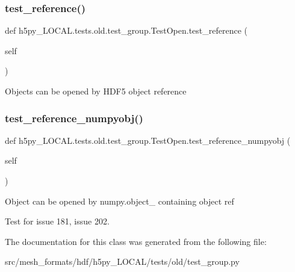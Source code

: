 \subsubsection{\texorpdfstring{test\+\_\+reference()}{test\_reference()}}
{\footnotesize\ttfamily def h5py\+\_\+\+L\+O\+C\+A\+L.\+tests.\+old.\+test\+\_\+group.\+Test\+Open.\+test\+\_\+reference (\begin{DoxyParamCaption}\item[{}]{self }\end{DoxyParamCaption})}

\begin{DoxyVerb}Objects can be opened by HDF5 object reference \end{DoxyVerb}
 \mbox{\label{classh5py__LOCAL_1_1tests_1_1old_1_1test__group_1_1TestOpen_a9458f640cd8ae18bd56071d00f30a915}} 
\subsubsection{\texorpdfstring{test\+\_\+reference\+\_\+numpyobj()}{test\_reference\_numpyobj()}}
{\footnotesize\ttfamily def h5py\+\_\+\+L\+O\+C\+A\+L.\+tests.\+old.\+test\+\_\+group.\+Test\+Open.\+test\+\_\+reference\+\_\+numpyobj (\begin{DoxyParamCaption}\item[{}]{self }\end{DoxyParamCaption})}

\begin{DoxyVerb}Object can be opened by numpy.object_ containing object ref

Test for issue 181, issue 202.
\end{DoxyVerb}
 

The documentation for this class was generated from the following file\+:\begin{DoxyCompactItemize}
\item 
src/mesh\+\_\+formats/hdf/h5py\+\_\+\+L\+O\+C\+A\+L/tests/old/test\+\_\+group.\+py\end{DoxyCompactItemize}
